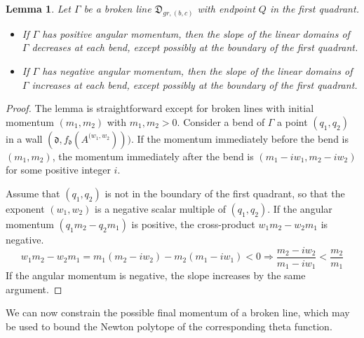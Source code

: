 \documentclass[11pt]{amsart}
\newtheorem{lemma}{Lemma}[section]
\theoremstyle{remark}
\numberwithin{equation}{section}
\newcommand{\fd}{\mathfrak{d}}
\begin{document}
\begin{lemma}
Let $\Gamma$ be a broken line $\mathfrak{D}_{gr,(b,c)}$ with endpoint $Q$ in the first quadrant.  
\begin{itemize}	
	\item If $\Gamma$ has positive angular momentum, then the slope of the linear domains of $\Gamma$ decreases at each bend, except possibly at the boundary of the first quadrant.
	\item If $\Gamma$ has negative angular momentum, then the slope of the linear domains of $\Gamma$ increases at each bend, except possibly at the boundary of the first quadrant.
\end{itemize}
\end{lemma}
\begin{proof}
The lemma is straightforward except for broken lines with initial momentum $(m_1,m_2)$ with $m_1,m_2>0$.  
Consider a bend of $\Gamma$ a point $(q_1,q_2)$ in a wall $(\fd,f_{\fd}(A^{(w_1,w_2})))$.  If the momentum immediately before the bend is $(m_1,m_2)$, the momentum immediately after the bend is $(m_1-iw_1,m_2-iw_2)$ for some positive integer $i$.  

Assume that $(q_1,q_2)$ is not in the boundary of the first quadrant, so that the exponent $(w_1,w_2)$ is a negative scalar multiple of $(q_1,q_2)$. If the angular momentum $(q_1m_2-q_2m_1)$ is positive, the cross-product $w_1m_2-w_2m_1$ is negative. 
\[ w_1m_2-w_2m_1=m_1(m_2-iw_2)-m_2(m_1-iw_1)<0 \Rightarrow \frac{m_2-iw_2}{m_1-iw_1} < \frac{m_2}{m_1}\]
If the angular momentum is negative, the slope increases by the same argument.
\end{proof}

We can now constrain the possible final momentum of a broken line, which may be used to bound the Newton polytope of the corresponding theta function.
\end{document}
